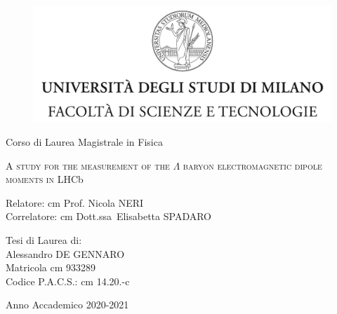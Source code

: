 

\begin{titlepage}
	\begin{figure}[t]
		\centering
		\includegraphics[width=390pt]{graphics/cover-page/logo.jpg}
		\centering
	\end{figure}	
\begin{center}
{\large Corso di Laurea Magistrale in Fisica}
\end{center}

\begin{center}
\vspace{2 cm}
{\Large \textsc{A study for the measurement of the $\Lambda$ baryon electromagnetic
dipole moments in LHC}b\par}
\end{center}
  \vspace{2 cm}
  
  \begin{flushleft}
  		 Relatore:  cm Prof. Nicola NERI\\
		 
  		 \noindent Correlatore:  cm Dott.ssa\ Elisabetta SPADARO
  \end{flushleft}
  \vspace{1 cm}
  \begin{flushright}
  	Tesi di Laurea di:\\ Alessandro DE GENNARO\\ Matricola  cm 933289\\ Codice P.A.C.S.:  cm 14.20.-c
  \end{flushright}
    	  
\begin{center}
\vspace{2 cm}
{\large Anno Accademico 2020-2021}
\end{center}
\end{titlepage}